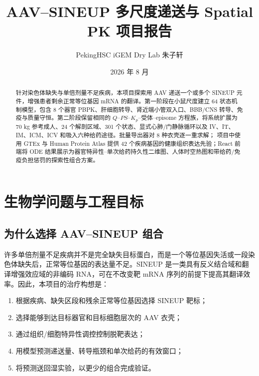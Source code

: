 \documentclass[UTF8,11pt,a4paper]{ctexart}
\title{\vspace{-1.2cm}\textbf{AAV--SINEUP 多尺度递送与 Spatial PK 项目报告}\\[0.6em]}
\author{PekingHSC iGEM Dry Lab 朱子轩}
\date{2026 年 8 月}
\begin{document}
\maketitle

\begin{center}
\begin{minipage}{0.92\textwidth}
\end{minipage}
\end{center}

\begin{abstract}
针对染色体缺失与单倍剂量不足疾病，本项目探索用 AAV 递送一个或多个 SINEUP 元件，增强患者剩余正常等位基因 mRNA 的翻译。第一阶段在小鼠尺度建立 64 状态机制模型，包含 8 个器官 PBPK、肝细胞转导、肾近端小管双入口、BBB/CNS 转导、免疫与质量守恒。第二阶段保留相同的 $Q$--$PS$--$K_p$--受体--episome 方程族，将系统扩展为 70 kg 参考成人、24 个解剖区域、301 个状态、显式心肺/门静脉循环以及 IV、IT、IM、ICM、ICV 和吸入六种给药途径。批量导出器对 8 种衣壳逐一重求解； 项目中使用 GTEx 与 Human Protein Atlas 提供 42 个疾病基因的健康组织表达先验；React 前端将 ODE 结果展示为器官特异性--单次给药持久性二维图、人体时空热图和带给药/免疫负担惩罚的探索性组合方案。
\end{abstract}

\tableofcontents
\clearpage

\section{生物学问题与工程目标}

\subsection{为什么选择 AAV--SINEUP 组合}
许多单倍剂量不足疾病并不是完全缺失目标蛋白，而是一个等位基因失活或一段染色体缺失后，正常等位基因的表达量不足。SINEUP 是一类具有反义结合域和翻译增强效应域的非编码 RNA，可在不改变靶 mRNA 序列的前提下提高其翻译效率\cite{sineup2015}。因此，本项目的治疗构想是：
\begin{enumerate}
  \item 根据疾病、缺失区段和残余正常等位基因选择 SINEUP 靶标；
  \item 选择能够到达目标器官和目标细胞层次的 AAV 衣壳；
  \item 通过组织/细胞特异性调控控制脱靶表达；
  \item 用模型预测递送量、转导瓶颈和单次给药的有效窗口；
  \item 将预测送回湿实验，以更少的组合完成验证。
\end{enumerate}
\end{document}
